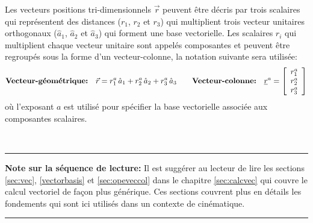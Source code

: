 Les vecteurs positions tri-dimensionnels $\vec{r}$ peuvent être décris par trois scalaires qui représentent des distances ($r_1$, $r_2$ et $r_3$) qui multiplient trois vecteur unitaires orthogonaux ($\hat{a}_1$, $\hat{a}_2$ et $\hat{a}_3$) qui forment une base vectorielle.  Les scalaires $r_i$ qui multiplient chaque vecteur unitaire sont appelés composantes et peuvent être regroupés sous la forme d'un vecteur-colonne, la notation suivante sera utilisée:
\begin{equation}
\text{\textbf{Vecteur-géométrique:}}\quad
\vec{r} = r_1^a \, \hat{a}_{1} + r_2^a \, \hat{a}_{2} + r_3^a \, \hat{a}_{3}
\quad \quad 
\text{\textbf{Vecteur-colonne:}}\quad
\underline{r}^{a} = \left[ \begin{array}{c} r_1^a \\ r_2^a \\ r_3^a  \end{array} \right] 
\label{eq:veccoldef}
\end{equation} 
où l'exposant $a$ est utilisé pour spécifier la base vectorielle associée aux composantes scalaires. 



\\ \noindent
\rule{\linewidth}{0.3mm}
\textbf{Note sur la séquence de lecture: }Il est suggérer au lecteur de lire les sections \ref{sec:vec}, \ref{vectorbasis} et \ref{sec:opeveccol} dans le chapitre \ref{sec:calcvec} qui couvre le calcul vectoriel de façon plus générique. Ces sections couvrent plus en détails les fondements qui sont ici utilisés dans un contexte de cinématique. 
\\
\rule{\linewidth}{0.3mm}


